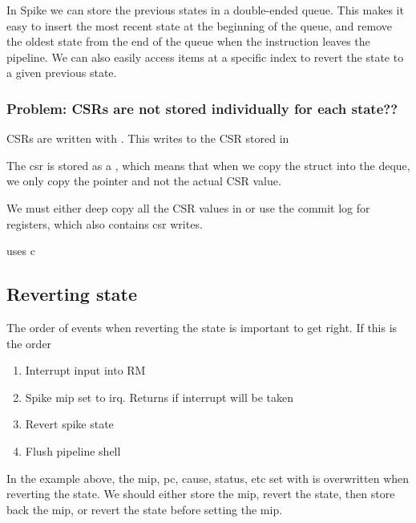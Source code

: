 In Spike we can store the previous states in a  double-ended queue. This makes it easy to insert the most recent state at the beginning of the queue, and remove the oldest state from the end of the queue when the instruction leaves the pipeline. 
We can also easily access items at a specific index to revert the state to a given previous state.




\subsubsection{Problem: CSRs are not stored individually for each state??}

CSRs are written with . This writes to the CSR stored in 

The  csr is stored as a , which means that when we copy the struct into the deque, we only copy the pointer and not the actual CSR value.

We must either deep copy all the CSR values in  or use the commit log for registers, which also contains csr writes. 

 uses c








\subsection{Reverting state}

The order of events when reverting the state is important to get right.
If this is the order

\begin{enumerate}
    \item Interrupt input into RM
    \item Spike mip set to irq. Returns if interrupt will be taken
    \item Revert spike state
    \item Flush pipeline shell
\end{enumerate}

In the example above, the mip, pc, cause, status, etc set with  is overwritten when reverting the state. We should either store the mip, revert the state, then store back the mip, or revert the state before setting the mip.


